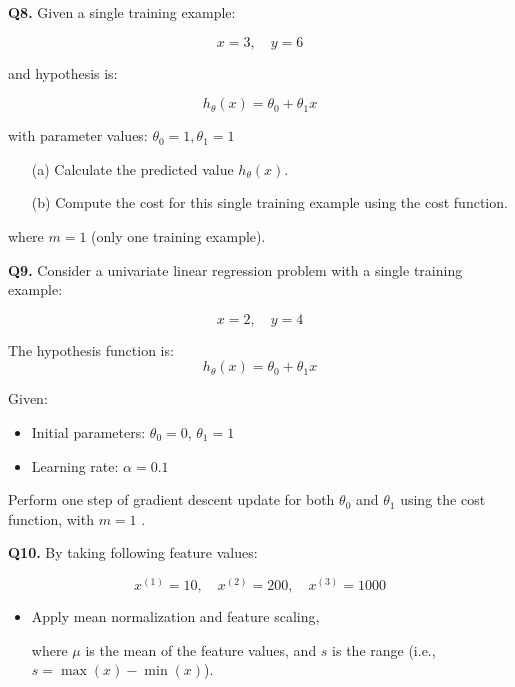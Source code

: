 \documentclass{article}
\begin{document}
\vspace{1em}
\textbf{Q8.} Given a single training example:

\[
x = 3, \quad y = 6
\]

and hypothesis is:

\[
h_\theta(x) = \theta_0 + \theta_1 x
\]

with parameter values: \( \theta_0 = 1, \theta_1 = 1 \)

\begin{itemize}
    \item[(a)] Calculate the predicted value \( h_\theta(x) \).
    
    \item[(b)] Compute the cost for this single training example using the cost function.
\end{itemize}

where \( m = 1 \) (only one training example).






\vspace{1\baselineskip}

\textbf{Q9.} Consider a univariate linear regression problem with a single training example:

\[
x = 2, \quad y = 4
\]

The hypothesis function is:
\[
h_\theta(x) = \theta_0 + \theta_1 x
\]

Given:
\begin{itemize}
    \item Initial parameters: \( \theta_0 = 0 \), \( \theta_1 = 1 \)
    \item Learning rate: \( \alpha = 0.1 \)
\end{itemize}

Perform one step of gradient descent update for both \( \theta_0 \) and \( \theta_1 \) using the cost function, 
with  \( m = 1 \) .

\vspace{1\baselineskip}

\textbf{Q10.} By taking following feature values:

\[
x^{(1)} = 10, \quad x^{(2)} = 200, \quad x^{(3)} = 1000
\]

\begin{itemize}
    \item Apply mean normalization and feature scaling,
   
    where \( \mu \) is the mean of the feature values, and \( s \) is the range (i.e., \( s = \max(x) - \min(x) \)).
\end{itemize}
\end{document}
